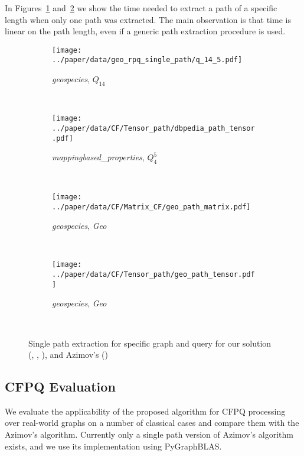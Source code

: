 In Figures~\ref{fig:geo_tensors_rpq} and~\ref{fig:dbpedia_tensors_rpq} we show the time needed to extract a path of a specific length when only one path was extracted.
The main observation is that time is linear on the path length, even if a generic path extraction procedure is used.

\begin{figure}
     \begin{subfigure}[b]{0.45\textwidth}
         \centering
         \texttt{[image: ../paper/data/geo\_rpq\_single\_path/q\_14\_5.pdf]}
         \caption{\footnotesize \textit{geospecies}, $Q_{14}$}
         \label{fig:geo_tensors_rpq}
     \end{subfigure}
     ~\begin{subfigure}[b]{0.45\textwidth}
         \centering
         \texttt{[image: ../paper/data/CF/Tensor\_path/dbpedia\_path\_tensor.pdf]}
         \caption{\footnotesize \textit{mappingbased\_properties}, $Q_{4}^5$}
         \label{fig:dbpedia_tensors_rpq}
     \end{subfigure}\\
     \begin{subfigure}[b]{0.45\textwidth}
         \centering
         \texttt{[image: ../paper/data/CF/Matrix\_CF/geo\_path\_matrix.pdf]}
         \caption{\footnotesize \textit{geospecies}, \textit{Geo}}
         \label{fig:geo_matrix_cfpq}
     \end{subfigure}
     ~\begin{subfigure}[b]{0.45\textwidth}
         \centering
         \texttt{[image: ../paper/data/CF/Tensor\_path/geo\_path\_tensor.pdf]}
         \caption{\footnotesize \textit{geospecies}, \textit{Geo}}
         \label{fig:geo_tensors_cfpq}
     \end{subfigure}\\
   \caption{Single path extraction for specific graph and query for our solution (, , ), and Azimov's ()}
\end{figure}

\subsection{CFPQ Evaluation}

We evaluate the applicability of the proposed algorithm for CFPQ processing over real-world graphs on a number of classical cases and compare them with the Azimov's algorithm.
Currently only a single path version of Azimov's algorithm exists, and we use its implementation using PyGraphBLAS.

